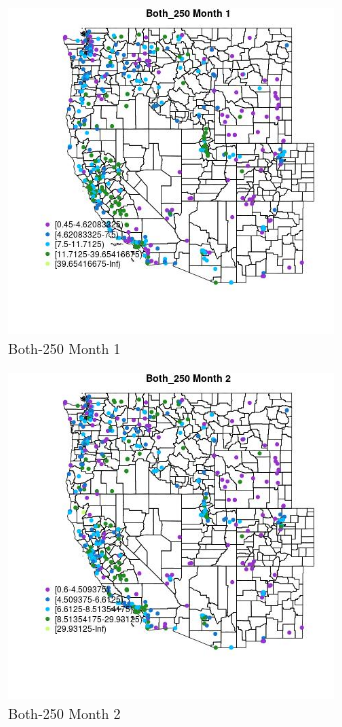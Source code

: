 \begin{figure} 
\centering  
\includegraphics[width=0.77\textwidth]{Code_Outputs/ML_input_report_ML_input_PM25_Step5_part_d_de_duplicated_aves_ML_input_MapObsMo1Both_250.jpg} 
\caption{\label{fig:ML_input_report_ML_input_PM25_Step5_part_d_de_duplicated_aves_ML_inputMapObsMo1Both_250}Both-250 Month 1} 
\end{figure} 
 

\begin{figure} 
\centering  
\includegraphics[width=0.77\textwidth]{Code_Outputs/ML_input_report_ML_input_PM25_Step5_part_d_de_duplicated_aves_ML_input_MapObsMo2Both_250.jpg} 
\caption{\label{fig:ML_input_report_ML_input_PM25_Step5_part_d_de_duplicated_aves_ML_inputMapObsMo2Both_250}Both-250 Month 2} 
\end{figure} 
 

